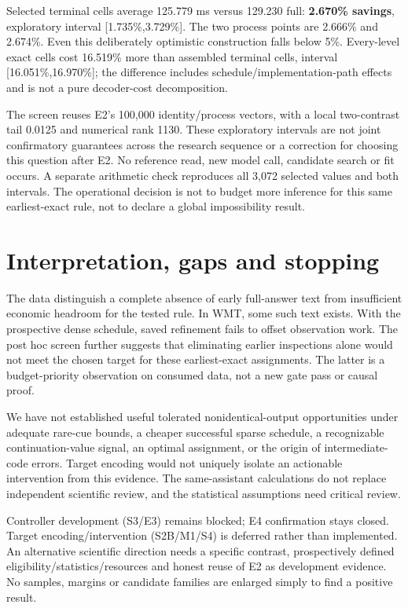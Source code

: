 \documentclass[11pt]{article}
\begin{document}
Selected terminal cells average 125.779 ms versus 129.230 full: \textbf{2.670\% savings}, exploratory interval [1.735\%,3.729\%]. The two process points are 2.666\% and 2.674\%. Even this deliberately optimistic construction falls below 5\%. Every-level exact cells cost 16.519\% more than assembled terminal cells, interval [16.051\%,16.970\%]; the difference includes schedule/implementation-path effects and is not a pure decoder-cost decomposition.

The screen reuses E2's 100,000 identity/process vectors, with a local two-contrast tail 0.0125 and numerical rank 1130. These exploratory intervals are not joint confirmatory guarantees across the research sequence or a correction for choosing this question after E2. No reference read, new model call, candidate search or fit occurs. A separate arithmetic check reproduces all 3,072 selected values and both intervals. The operational decision is not to budget more inference for this same earliest-exact rule, not to declare a global impossibility result.

\section{Interpretation, gaps and stopping}
The data distinguish a complete absence of early full-answer text from insufficient economic headroom for the tested rule. In WMT, some such text exists. With the prospective dense schedule, saved refinement fails to offset observation work. The post hoc screen further suggests that eliminating earlier inspections alone would not meet the chosen target for these earliest-exact assignments. The latter is a budget-priority observation on consumed data, not a new gate pass or causal proof.

We have not established useful tolerated nonidentical-output opportunities under adequate rare-cue bounds, a cheaper successful sparse schedule, a recognizable continuation-value signal, an optimal assignment, or the origin of intermediate-code errors. Target encoding would not uniquely isolate an actionable intervention from this evidence. The same-assistant calculations do not replace independent scientific review, and the statistical assumptions need critical review.

Controller development (S3/E3) remains blocked; E4 confirmation stays closed. Target encoding/intervention (S2B/M1/S4) is deferred rather than implemented. An alternative scientific direction needs a specific contrast, prospectively defined eligibility/statistics/resources and honest reuse of E2 as development evidence. No samples, margins or candidate families are enlarged simply to find a positive result.
\end{document}
